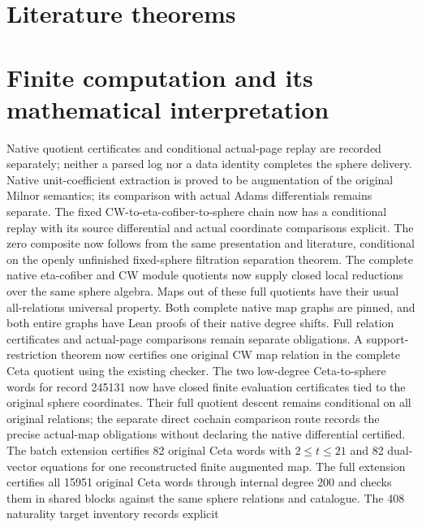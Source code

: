 \chapter{Literature theorems}
\label{chap:literature-theorems-main}


\chapter{Finite computation and its mathematical interpretation}
\label{chap:finite-computation-main}
Native quotient certificates and conditional actual-page replay are recorded
separately; neither a parsed log nor a data identity completes the sphere delivery.
Native unit-coefficient extraction is proved to be augmentation of the original
Milnor semantics; its comparison with actual Adams differentials remains separate.
The fixed CW-to-eta-cofiber-to-sphere chain now has a conditional replay with
its source differential and actual coordinate comparisons explicit. The zero
composite now follows from the same presentation and literature, conditional
on the openly unfinished fixed-sphere filtration separation theorem.
The complete native eta-cofiber and CW module quotients now supply closed
local reductions over the same sphere algebra. Maps out of these full quotients
have their usual all-relations universal property. Both complete native map
graphs are pinned, and both entire graphs have Lean proofs of their native
degree shifts. Full relation certificates and actual-page comparisons remain
separate obligations. A support-restriction theorem now certifies one original
CW map relation in the complete Ceta quotient using the existing checker.
The two low-degree Ceta-to-sphere words for record 245131 now have
closed finite evaluation certificates tied to the original sphere coordinates.
Their full quotient descent remains conditional on all original relations;
the separate direct cochain comparison route records the precise actual-map
obligations without declaring the native differential certified.
The batch extension certifies 82 original Ceta words with $2\le t\le21$
and 82 dual-vector equations for one reconstructed finite augmented map.
The full extension certifies all 15951 original Ceta words through
internal degree 200 and checks them in shared blocks against the same sphere
relations and catalogue. The 408 naturality target inventory records explicit
